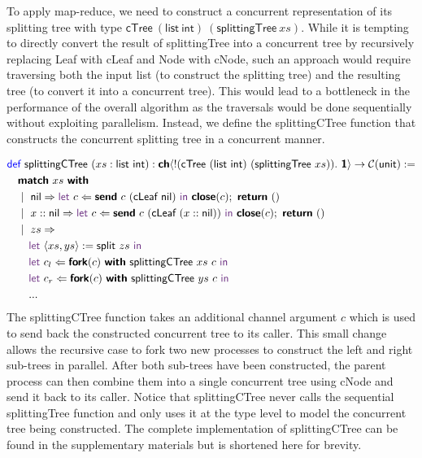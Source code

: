 To apply map-reduce, we need to construct a concurrent representation of its 
splitting tree with type $\textsf{cTree}\ (\textsf{list}\ \textsf{int})\ (\textsf{splittingTree}\ xs)$.
While it is tempting to directly convert the result of \textsf{splittingTree} into a concurrent tree
by recursively replacing \textsf{Leaf} with \textsf{cLeaf} and \textsf{Node} with \textsf{cNode},
such an approach would require traversing both the input list (to construct the splitting tree) 
and the resulting tree (to convert it into a concurrent tree). This would lead to a 
bottleneck in the performance of the overall algorithm as the traversals would be done 
sequentially without exploiting parallelism. Instead, we define the \textsf{splittingCTree} 
function that constructs the concurrent splitting tree in a concurrent manner.

\vspace{-1em}
\begingroup
\small
\addtolength{\jot}{-0.2em}
\begin{align*}
  &\Def\ \textsf{splittingCTree}\ (xs : \textsf{list}\ \textsf{int}) : 
      \CH{!(\textsf{cTree}\ (\textsf{list}\ \textsf{int})\ (\textsf{splittingTree}\ xs)).\ \End} \rightarrow \CM{\textsf{unit}} := \\
  &\quad\Match\ xs\ \With \\
  &\quad\mid\ \textsf{nil} \Rightarrow 
    \Let\ c \Leftarrow \Send\ c\ (\textsf{cLeaf}\ \textsf{nil})\ \In\ \Close(c);\ \Return\ () \\
  &\quad\mid\ x :: \textsf{nil} \Rightarrow 
    \Let\ c \Leftarrow \Send\ c\ (\textsf{cLeaf}\ (x :: \textsf{nil}))\ \In\ \Close(c);\ \Return\ () \\
  &\quad\mid\ zs \Rightarrow \\
  &\qquad\Let\ \langle{xs, ys}\rangle := \textsf{split}\ zs\ \In \\
  &\qquad\Let\ c_l \Leftarrow \Fork(c)\ \With\ \textsf{splittingCTree}\ xs\ c\ \In \\
  &\qquad\Let\ c_r \Leftarrow \Fork(c)\ \With\ \textsf{splittingCTree}\ ys\ c\ \In \\
  &\qquad ...
\end{align*}
\endgroup
The \textsf{splittingCTree} function takes an additional channel argument $c$ which is used to
send back the constructed concurrent tree to its caller. This small change allows the
recursive case to fork two new processes to construct the left and right sub-trees
in parallel. After both sub-trees have been constructed, the parent process can then
combine them into a single concurrent tree using \textsf{cNode} and send it back
to its caller. Notice that \textsf{splittingCTree} never calls the
sequential \textsf{splittingTree} function and only uses it at the type level to model
the concurrent tree being constructed. The complete implementation of
\textsf{splittingCTree} can be found in the supplementary materials but is shortened here for brevity.

